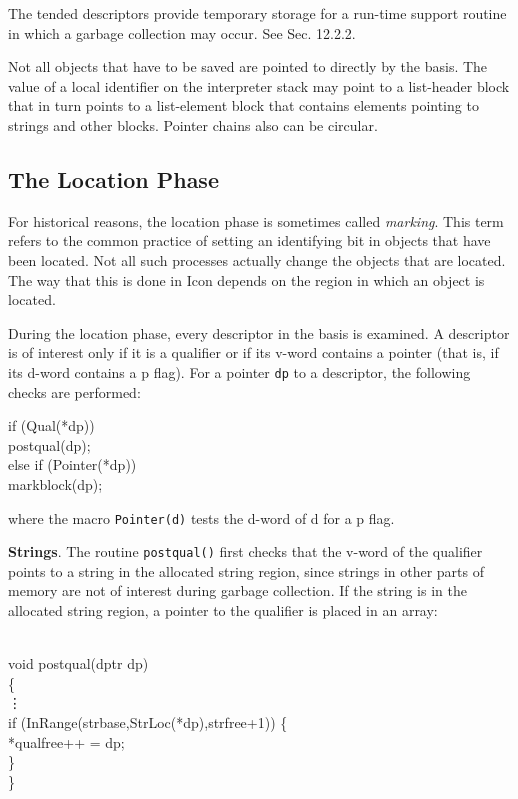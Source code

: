 The tended descriptors provide temporary storage for a run-time
support routine in which a garbage collection may occur. See Sec. 12.2.2.

Not all objects that have to be saved are pointed to directly by the
basis. The value of a local identifier on the interpreter stack may
point to a list-header block that in turn points to a list-element
block that contains elements pointing to strings and other
blocks. Pointer chains also can be circular.

\subsection{The Location Phase}
\label{GC-Location-Phase}

For historical reasons, the location phase is sometimes called
\textit{marking}. This term refers to the common practice of setting
an identifying bit in objects that have been located. Not all such
processes actually change the objects that are located. The way that
this is done in Icon depends on the region in which an object is
located.

During the location phase, every descriptor in the basis is
examined. A descriptor is of interest only if it is a qualifier or if
its v-word contains a pointer (that is, if its d-word contains a p
flag). For a pointer \texttt{dp} to a descriptor, the following checks
are performed:

\begin{iconcode}
\>if (Qual(*dp))\\
\>\>postqual(dp);\\
\>else if (Pointer(*dp))\\
\>\>markblock(dp);
\end{iconcode}


\noindent
where the macro \texttt{Pointer(d)} tests the d-word of d for a p flag.

\textbf{Strings}. The routine \texttt{postqual()} first checks that
the v-word of the qualifier points to a string in the allocated string
region, since strings in other parts of memory are not of interest
during garbage collection. If the string is in the allocated string
region, a pointer to the qualifier is placed in an array:

\begin{iconcode}\\
\>void postqual(dptr dp)\\
\>\{\\
\>\>\>\vdots\\
\>if (InRange(strbase,StrLoc(*dp),strfree+1)) \{\\
\>\>*qualfree++ = dp;\\
\>\>\}\\
\>\}
\end{iconcode}



